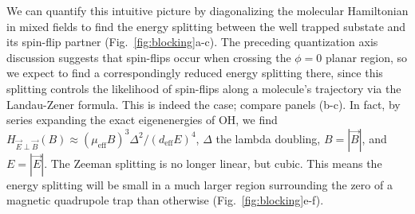 \documentclass[%
 reprint,
 amsmath,amssymb,
 aps,
prl,
]{revtex4-1}
\newcommand{\epbm}{{\vec{E}\!\perp\!\vec{B}}}
\begin{document}
We can quantify this intuitive picture by diagonalizing the molecular Hamiltonian in mixed fields to find the energy splitting between the well trapped substate and its spin-flip partner (Fig.~\ref{fig:blocking}a-c). 
The preceding quantization axis discussion suggests that spin-flips occur when crossing the $\phi=0$ planar region, so we expect to find a correspondingly reduced energy splitting there, since this splitting controls the likelihood of spin-flips along a molecule's trajectory via the Landau-Zener formula. 
This is indeed the case; compare panels (b-c). In fact, by series expanding the exact eigenenergies of OH, we find $H_\epbm(B)\approx (\mu_\text{eff}B)^3\Delta^2/(d_\text{eff}E)^4$, $\Delta$ the lambda doubling, $B=|\vec{B}|$, and $E=|\vec{E}|$. 
The Zeeman splitting is no longer linear, but cubic. 
This means the energy splitting will be small in a much larger region surrounding the zero of a magnetic quadrupole trap than otherwise (Fig.~\ref{fig:blocking}e-f).


\end{document}
